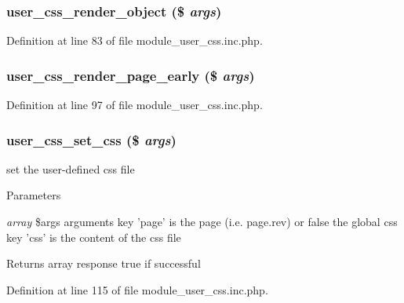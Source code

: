 \hypertarget{module__user__css_8inc_8php_ab26eaefed01451501b96acf67fbd9401}{
\subsubsection[{user\_\-css\_\-render\_\-object}]{\setlength{\rightskip}{0pt plus 5cm}user\_\-css\_\-render\_\-object (\$ {\em args})}}
\label{module__user__css_8inc_8php_ab26eaefed01451501b96acf67fbd9401}


Definition at line 83 of file module\_\-user\_\-css.inc.php.

\hypertarget{module__user__css_8inc_8php_af0bd5e1927965e4cd775bfb30d510ac1}{
\subsubsection[{user\_\-css\_\-render\_\-page\_\-early}]{\setlength{\rightskip}{0pt plus 5cm}user\_\-css\_\-render\_\-page\_\-early (\$ {\em args})}}
\label{module__user__css_8inc_8php_af0bd5e1927965e4cd775bfb30d510ac1}


Definition at line 97 of file module\_\-user\_\-css.inc.php.

\hypertarget{module__user__css_8inc_8php_a568a25309a9a2419076775fd77dbdfda}{
\subsubsection[{user\_\-css\_\-set\_\-css}]{\setlength{\rightskip}{0pt plus 5cm}user\_\-css\_\-set\_\-css (\$ {\em args})}}
\label{module__user__css_8inc_8php_a568a25309a9a2419076775fd77dbdfda}
set the user-\/defined css file


\begin{DoxyParams}{Parameters}
\item[{\em array}]\$args arguments key 'page' is the page (i.e. page.rev) or false the global css key 'css' is the content of the css file \end{DoxyParams}
\begin{DoxyReturn}{Returns}
array response true if successful 
\end{DoxyReturn}


Definition at line 115 of file module\_\-user\_\-css.inc.php.

